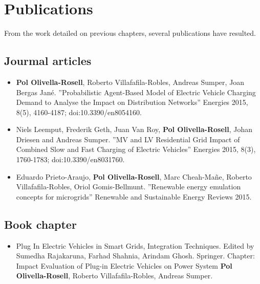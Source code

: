 \documentclass[a4paper,11pt,twoside,openright]{report}
\begin{document}
\chapter{Publications}
\label{cap:publicacions}
From the work detailed on previous chapters, several publications have resulted.

\section{Jourmal articles}
\begin{itemize}
	\item \textbf{Pol Olivella-Rosell}, Roberto Villafafila-Robles, Andreas Sumper, Joan Bergas Jan\'{e}. 
	''Probabilistic Agent-Based Model of Electric Vehicle Charging Demand to Analyse the Impact on Distribution Networks'' Energies 2015, 8(5), 4160-4187; doi:10.3390/en8054160.
	\item Niels Leemput, Frederik Geth, Juan Van Roy, \textbf{Pol Olivella-Rosell}, Johan Driesen and Andreas Sumper. 
	''MV and LV Residential Grid Impact of Combined Slow and Fast Charging of Electric Vehicles'' Energies 2015, 8(3), 1760-1783; doi:10.3390/en8031760.
	\item Eduardo Prieto-Araujo, \textbf{Pol Olivella-Rosell}, Marc Cheah-Ma\~{n}e, Roberto Villafafila-Robles,
	Oriol Gomis-Bellmunt.
	 ''Renewable energy emulation concepts for microgrids'' Renewable and Sustainable Energy Reviews 2015.
\end{itemize}

\section{Book chapter}
\begin{itemize}
\item Plug In Electric Vehicles in Smart Grids, Integration Techniques.
Edited by  Sumedha Rajakaruna, Farhad Shahnia, Arindam Ghosh. Springer.
Chapter: Impact Evaluation of Plug-in Electric Vehicles on Power System
\textbf{Pol Olivella-Rosell}, Roberto Villafafila-Robles, Andreas Sumper.
\end{itemize}
\end{document}
